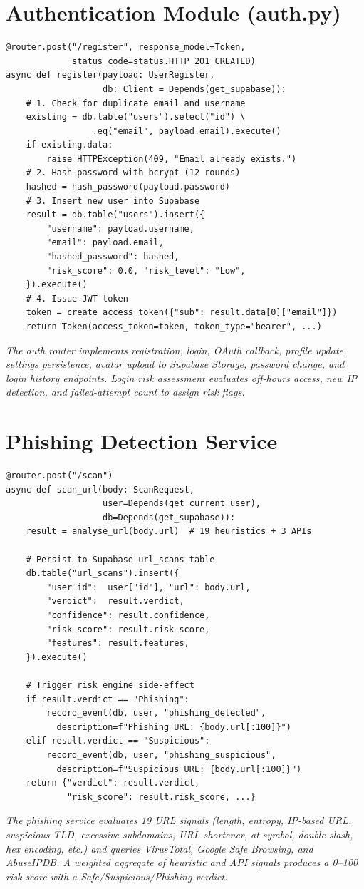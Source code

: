 \section{Authentication Module (auth.py)}
\begin{verbatim}
@router.post("/register", response_model=Token,
             status_code=status.HTTP_201_CREATED)
async def register(payload: UserRegister,
                   db: Client = Depends(get_supabase)):
    # 1. Check for duplicate email and username
    existing = db.table("users").select("id") \
                 .eq("email", payload.email).execute()
    if existing.data:
        raise HTTPException(409, "Email already exists.")
    # 2. Hash password with bcrypt (12 rounds)
    hashed = hash_password(payload.password)
    # 3. Insert new user into Supabase
    result = db.table("users").insert({
        "username": payload.username,
        "email": payload.email,
        "hashed_password": hashed,
        "risk_score": 0.0, "risk_level": "Low",
    }).execute()
    # 4. Issue JWT token
    token = create_access_token({"sub": result.data[0]["email"]})
    return Token(access_token=token, token_type="bearer", ...)
\end{verbatim}
\textit{The auth router implements registration, login, OAuth callback, profile update, settings persistence, avatar upload to Supabase Storage, password change, and login history endpoints. Login risk assessment evaluates off-hours access, new IP detection, and failed-attempt count to assign risk flags.}

\section{Phishing Detection Service}
\begin{verbatim}
@router.post("/scan")
async def scan_url(body: ScanRequest,
                   user=Depends(get_current_user),
                   db=Depends(get_supabase)):
    result = analyse_url(body.url)  # 19 heuristics + 3 APIs

    # Persist to Supabase url_scans table
    db.table("url_scans").insert({
        "user_id":  user["id"], "url": body.url,
        "verdict":  result.verdict,
        "confidence": result.confidence,
        "risk_score": result.risk_score,
        "features": result.features,
    }).execute()

    # Trigger risk engine side-effect
    if result.verdict == "Phishing":
        record_event(db, user, "phishing_detected",
          description=f"Phishing URL: {body.url[:100]}")
    elif result.verdict == "Suspicious":
        record_event(db, user, "phishing_suspicious",
          description=f"Suspicious URL: {body.url[:100]}")
    return {"verdict": result.verdict,
            "risk_score": result.risk_score, ...}
\end{verbatim}
\textit{The phishing service evaluates 19 URL signals (length, entropy, IP-based URL, suspicious TLD, excessive subdomains, URL shortener, at-symbol, double-slash, hex encoding, etc.) and queries VirusTotal, Google Safe Browsing, and AbuseIPDB. A weighted aggregate of heuristic and API signals produces a 0--100 risk score with a Safe/Suspicious/Phishing verdict.}

